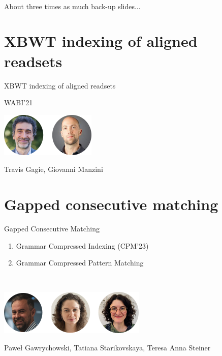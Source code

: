 \appendix
\backupbegin

\begin{frame}
  \centering
  \\
  \bigskip
  {\large About three times as much back-up slides...}
\end{frame}

%
%


%

\section{XBWT indexing of aligned readsets}
\begin{frame}
  \centering
  {\Large XBWT indexing of aligned readsets}
    
  \medskip
  {\large WABI'21}
  \bigskip
  
  \includegraphics{pictures/mindmap/xbwt.png}
  
  \bigskip
  Travis Gagie, Giovanni Manzini
\end{frame}

%

\section{Gapped consecutive matching}

\begin{frame}
  \centering
  {\Large Gapped Consecutive Matching}

  \bigskip
  \begin{minipage}{0.55\textwidth}  
    \begin{enumerate}
      \item Grammar Compressed Indexing (CPM'23)
      \item Grammar Compressed Pattern Matching
    \end{enumerate}
  \end{minipage}\\
  \bigskip
  
  \includegraphics{pictures/mindmap/gapped.png}

  \bigskip
  Paweł Gawrychowski, Tatiana Starikovskaya, Teresa Anna Steiner
\end{frame}


%
\backupend


